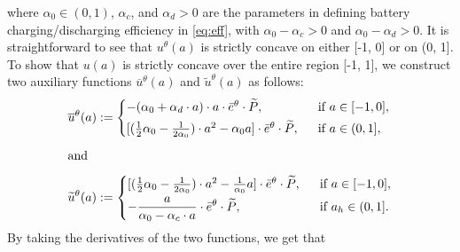 \documentclass{article}
\theoremstyle{definition}
\theoremstyle{plain}
\begin{document}
	where $\alpha_0 \in (0, 1)$, $\alpha_c$,  and $\alpha_d > 0$ are the parameters in defining battery charging/discharging efficiency in \eqref{eq:eff}, with $\alpha_0 - \alpha_c > 0$ and $\alpha_0 - \alpha_d > 0$. 
	It is straightforward to see that $u^{\theta}(a)$ is strictly concave on either [-1, 0] or on (0, 1]. To show that $u(a)$ is strictly concave over the entire region [-1, 1], we construct two auxiliary functions $\overline{u}^{\theta}(a)$ and $\widetilde{u}^{\theta}(a)$ as follows:  
	\begin{align}
	& \overline{u}^{\theta}(a) := \begin{cases}
	-(\alpha_0 + \alpha_d \cdot a) \cdot a  \cdot \Bar{e}^{\theta} \cdot \widetilde{P}, &\ \text{ if } a\in[-1,0],\\[3pt]
	[(\frac{1}{2}\alpha_0-\frac{1}{2\alpha_0}) \cdot a^2 - \alpha_0  a] \cdot \Bar{e}^{\theta} \cdot \widetilde{P}, &\ \text{ if } a \in (0,1],
	\end{cases} \\[5pt]
	& \mathrm{and}  \nonumber \\[5pt]
	&\widetilde{u}^{\theta}(a)  :=  \begin{cases}
	[(\frac{1}{2}\alpha_0-\frac{1}{2\alpha_0}) \cdot a^2 - \frac{1}{\alpha_0}  a] \cdot \Bar{e}^{\theta} \cdot \widetilde{P},   &\ \text{ if } a \in[-1,0],\\[3pt]
	\displaystyle -  \frac{a}{\alpha_0 - \alpha_c \cdot a} \cdot \Bar{e}^{\theta} \cdot \widetilde{P},  &\ \text{ if } a_h  \in (0,1].
	\end{cases} 
	\end{align} 
	By taking the derivatives of the two functions, we get that 
	
\end{document}
